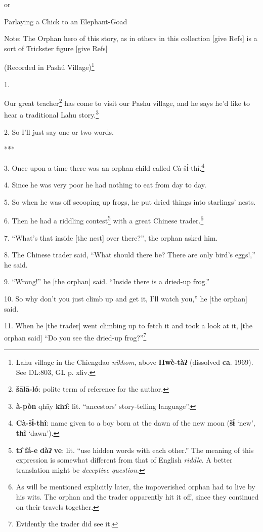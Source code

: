 \setcounter{footnote}{0}

or

Parlaying a Chick to an Elephant-Goad

Note: The Orphan hero of this story, as in others in this collection [give Refs]
is a sort of Trickster figure [give Refs]

(Recorded in Pashú Village)\footnote{Lahu village in the Chiengdao \textit{nikhom}, above \textbf{Hwè-tàʔ} (dissolved \textbf{ca}. 1969). See DL:803, GL p. xliv.}

1. 

Our great teacher\footnote{\textbf{šālā-ló}: polite term of reference for the author.} has come to visit our Pashu village, and he says he'd like
to hear a traditional Lahu story.\footnote{\textbf{à-pòn} qhāy \textbf{khɔ̂}: lit. ``ancestors' story-telling language''.}

2. So I'll just say one or two words.

***

3. Once upon a time there was an orphan child called Cà-šɨ́-thî.\footnote{\textbf{Cà-šɨ́-thî}: name given to a boy born at the dawn of the new moon (\textbf{šɨ́} `new', \textbf{thî} `dawn').}

4. Since he was very poor he had nothing to eat from day to day.

5. So when he was off scooping up frogs, he put dried things into starlings' nests.

6. Then he had a riddling contest\footnote{\textbf{tɔ̂} \textbf{fá-e} \textbf{dàʔ} \textbf{ve}: lit. ``use hidden words with each other.'' The meaning of this expression is somewhat different from that of English \textit{riddle}. A better translation might be \textit{deceptive question}.} with a great Chinese trader.\footnote{As will be mentioned explicitly later, the impoverished orphan had to live by his wits. The orphan and the trader apparently hit it off, since they continued on their travels together.}

7. ``What's that inside [the nest] over there?'', the orphan asked him.

8. The Chinese trader said, ``What should there be? There are only bird's eggs!,''
he said.

9. ``Wrong!'' he [the orphan] said. ``Inside there is a dried-up frog.''

10. So why don't you just climb up and get it, I'll watch you,'' he [the orphan]
said.

11. When he [the trader] went climbing up to fetch it and took a look at it, [the
orphan said] ``Do you see the dried-up frog?''\footnote{Evidently the trader did see it.}

